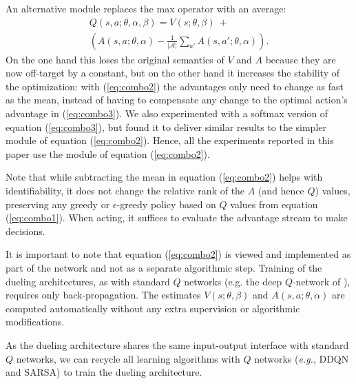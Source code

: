 An alternative module replaces the max operator with an average:
\begin{multline}
Q(s,a;\theta,\alpha,\beta) =  {V}(s;\theta,\beta)~+\\
\left({A}(s,a;\theta,\alpha) - \frac{1}{|\mathcal{A}|} \sum_{a'} {A}(s, a' ;\theta,\alpha) \right).
\label{eq:combo2}
\end{multline}
On the one hand this loses the original semantics of $V$ and $A$ because they are now off-target by a constant, but on the other hand it increases the stability of the optimization: with (\ref{eq:combo2}) the advantages only need to change as fast as the mean, instead of having to compensate any change to the optimal action's advantage in (\ref{eq:combo3}). We also experimented with a softmax version of equation (\ref{eq:combo3}), but found it to deliver similar results to the simpler module of equation (\ref{eq:combo2}). Hence, all the experiments reported in this paper use the module of equation (\ref{eq:combo2}). 

Note that while subtracting the mean in equation (\ref{eq:combo2}) helps with identifiability, it does not change the relative rank of the ${A}$ (and hence $Q$) values, preserving any greedy or $\epsilon$-greedy policy based on $Q$ values from equation (\ref{eq:combo1}).
When acting, it suffices to evaluate the advantage stream to make decisions.

It is important to note that equation (\ref{eq:combo2}) is viewed and implemented as part of the network and not as a separate algorithmic step. Training of the dueling architectures, as with standard $Q$ networks (e.g. the deep $Q$-network of \citet{Mnih:2015}), requires only back-propagation. The estimates ${V}(s;\theta,\beta)$ and ${A}(s,a;\theta,\alpha)$ are computed automatically without any extra supervision or algorithmic modifications. 

As the dueling architecture shares the same input-output interface with standard $Q$ networks, 
we can recycle all learning algorithms with $Q$ networks (\emph{e.g.}, DDQN and SARSA) to train the dueling architecture.








